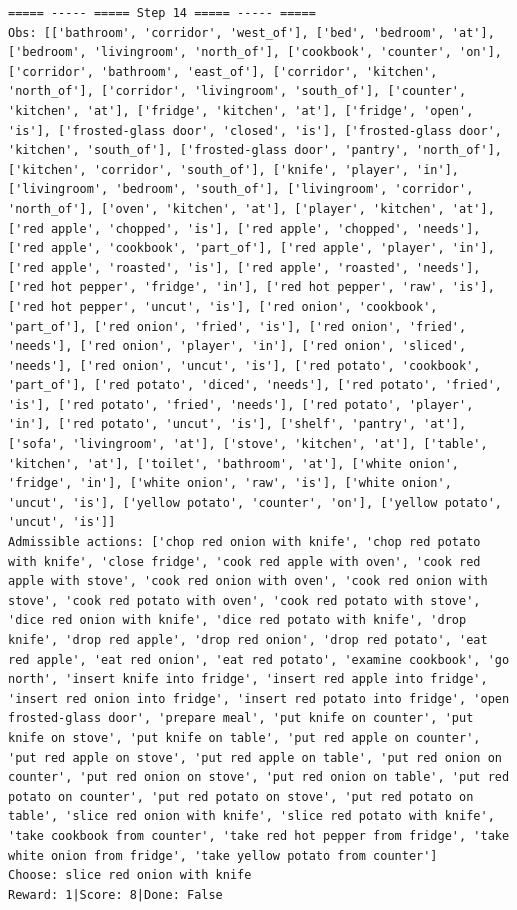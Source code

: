 \documentclass[11pt]{article}
\begin{document}
\begin{lstlisting}
===== ----- ===== Step 14 ===== ----- =====
Obs: [['bathroom', 'corridor', 'west_of'], ['bed', 'bedroom', 'at'], ['bedroom', 'livingroom', 'north_of'], ['cookbook', 'counter', 'on'], ['corridor', 'bathroom', 'east_of'], ['corridor', 'kitchen', 'north_of'], ['corridor', 'livingroom', 'south_of'], ['counter', 'kitchen', 'at'], ['fridge', 'kitchen', 'at'], ['fridge', 'open', 'is'], ['frosted-glass door', 'closed', 'is'], ['frosted-glass door', 'kitchen', 'south_of'], ['frosted-glass door', 'pantry', 'north_of'], ['kitchen', 'corridor', 'south_of'], ['knife', 'player', 'in'], ['livingroom', 'bedroom', 'south_of'], ['livingroom', 'corridor', 'north_of'], ['oven', 'kitchen', 'at'], ['player', 'kitchen', 'at'], ['red apple', 'chopped', 'is'], ['red apple', 'chopped', 'needs'], ['red apple', 'cookbook', 'part_of'], ['red apple', 'player', 'in'], ['red apple', 'roasted', 'is'], ['red apple', 'roasted', 'needs'], ['red hot pepper', 'fridge', 'in'], ['red hot pepper', 'raw', 'is'], ['red hot pepper', 'uncut', 'is'], ['red onion', 'cookbook', 'part_of'], ['red onion', 'fried', 'is'], ['red onion', 'fried', 'needs'], ['red onion', 'player', 'in'], ['red onion', 'sliced', 'needs'], ['red onion', 'uncut', 'is'], ['red potato', 'cookbook', 'part_of'], ['red potato', 'diced', 'needs'], ['red potato', 'fried', 'is'], ['red potato', 'fried', 'needs'], ['red potato', 'player', 'in'], ['red potato', 'uncut', 'is'], ['shelf', 'pantry', 'at'], ['sofa', 'livingroom', 'at'], ['stove', 'kitchen', 'at'], ['table', 'kitchen', 'at'], ['toilet', 'bathroom', 'at'], ['white onion', 'fridge', 'in'], ['white onion', 'raw', 'is'], ['white onion', 'uncut', 'is'], ['yellow potato', 'counter', 'on'], ['yellow potato', 'uncut', 'is']]
Admissible actions: ['chop red onion with knife', 'chop red potato with knife', 'close fridge', 'cook red apple with oven', 'cook red apple with stove', 'cook red onion with oven', 'cook red onion with stove', 'cook red potato with oven', 'cook red potato with stove', 'dice red onion with knife', 'dice red potato with knife', 'drop knife', 'drop red apple', 'drop red onion', 'drop red potato', 'eat red apple', 'eat red onion', 'eat red potato', 'examine cookbook', 'go north', 'insert knife into fridge', 'insert red apple into fridge', 'insert red onion into fridge', 'insert red potato into fridge', 'open frosted-glass door', 'prepare meal', 'put knife on counter', 'put knife on stove', 'put knife on table', 'put red apple on counter', 'put red apple on stove', 'put red apple on table', 'put red onion on counter', 'put red onion on stove', 'put red onion on table', 'put red potato on counter', 'put red potato on stove', 'put red potato on table', 'slice red onion with knife', 'slice red potato with knife', 'take cookbook from counter', 'take red hot pepper from fridge', 'take white onion from fridge', 'take yellow potato from counter']
Choose: slice red onion with knife
Reward: 1|Score: 8|Done: False


\end{lstlisting}
\end{document}
